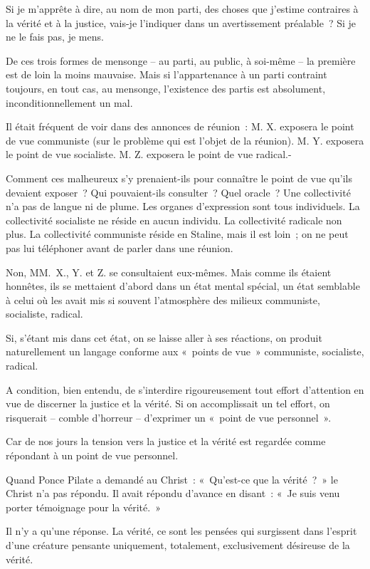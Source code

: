 \documentclass[french,twoside]{book} %
\begin{document}
Si je m’apprête à dire, au nom de mon parti, des choses que j’estime contraires à la vérité et à la justice, vais-je l’indiquer dans un avertissement préalable ? Si je ne le fais pas, je mens.\par
De ces trois formes de mensonge – au parti, au public, à soi-même – la première est de loin la moins mauvaise. Mais si l’appartenance à un parti contraint toujours, en tout cas, au mensonge, l’existence des partis est absolument, inconditionnellement un mal.\par
Il était fréquent de voir dans des annonces de réunion : M. X. exposera le point de vue communiste (sur le problème qui est l’objet de la réunion). M. Y. exposera le point de vue socialiste. M. Z. exposera le point de vue radical.-\par
Comment ces malheureux s’y prenaient-ils pour connaître le point de vue qu’ils devaient exposer ? Qui pouvaient-ils consulter ? Quel oracle ? Une collectivité n’a pas de langue ni de plume. Les organes d’expression sont tous individuels. La collectivité socialiste ne réside en aucun individu. La collectivité radicale non plus. La collectivité communiste réside en Staline, mais il est loin ; on ne peut pas lui téléphoner avant de parler dans une réunion.\par
Non, MM. X., Y. et Z. se consultaient eux-mêmes. Mais comme ils étaient honnêtes, ils se mettaient d’abord dans un état mental spécial, un état semblable à celui où les avait mis si souvent l’atmosphère des milieux communiste, socialiste, radical.\par
Si, s’étant mis dans cet état, on se laisse aller à ses réactions, on produit naturellement un langage conforme aux « points de vue » communiste, socialiste, radical.\par
A condition, bien entendu, de s’interdire rigoureusement tout effort d’attention en vue de discerner la justice et la vérité. Si on accomplissait un tel effort, on risquerait – comble d’horreur – d’exprimer un « point de vue personnel ».\par
Car de nos jours la tension vers la justice et la vérité est regardée comme répondant à un point de vue personnel.\par
Quand Ponce Pilate a demandé au Christ : « Qu’est-ce que la vérité ? » le Christ n’a pas répondu. Il avait répondu d’avance en disant : « Je suis venu porter témoignage pour la vérité. »\par
Il n’y a qu’une réponse. La vérité, ce sont les pensées qui surgissent dans l’esprit d’une créature pensante uniquement, totalement, exclusivement désireuse de la vérité.\par
\end{document}
